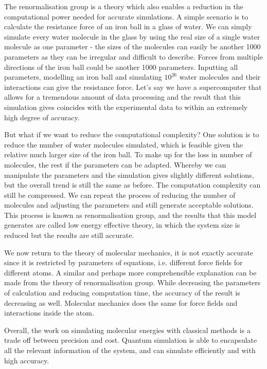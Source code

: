 \documentclass[12pt]{article}
\begin{document}
The renormalisation group is a theory which also enables a reduction in the computational power needed for accurate simulations. A simple scenario
is to calculate the resistance force of an iron ball in a glass of water. We can simply simulate every water molecule in the glass by using the
 real size of a single water molecule as one parameter - the sizes of the molecules can easily be another 1000 parameters as they can be
 irregular and difficult to describe. Forces from multiple directions of the iron ball could be another 1000 parameters. Inputting all parameters,
  modelling an iron ball and simulating $10^{26}$ water molecules and their interactions can give the resistance force. Let’s say we have a
  supercomputer that allows for a tremendous amount of data processing and the result that this simulation gives coincides with the experimental data
  to within an extremely high degree of accuracy.

But what if we want to reduce the computational complexity? One solution is to reduce the number of water molecules simulated, which is feasible given
 the relative much larger size of the iron ball. To make up for the loss in number of molecules, the rest if the parameters can be adapted. Whereby we
can manipulate the parameters and the simulation gives slightly different solutions, but the overall trend is still the same as before. The computation
 complexity can still be compressed. We can repeat the process of reducing the number of molecules and adjusting the parameters and still generate
  acceptable solutions. This process is known as renormalisation group, and the results that this model generates are called low energy effective
  theory, in which the system size is reduced but the results are still accurate.

We now return to the theory of molecular mechanics, it is not exactly accurate since it is restricted by parameters of equations, i.e. different
force fields for different atoms. A similar and perhaps more comprehensible explanation can be made from the theory of renormalisation group.
While decreasing the parameters of calculation and reducing computation time, the accuracy of the result is decreasing as well. Molecular mechanics
 does the same for force fields and interactions inside the atom.

Overall, the work on simulating molecular energies with classical methods is a trade off between precision and cost. Quantum simulation is able
to encapsulate all the relevant information of the system, and can simulate efficiently and with high accuracy.
\end{document}
